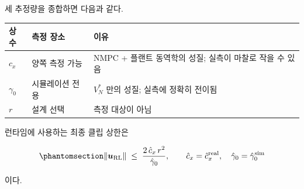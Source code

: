 \documentclass[
  11pt,
]{article}
\newcounter{none} %
\theoremstyle{plain}
\theoremstyle{plain}
\theoremstyle{definition}
\theoremstyle{remark}
\begin{document}
세 추정량을 종합하면 다음과 같다.

{\def\LTcaptype{none} %
\begin{longtable}[]{@{}
  >{\raggedright\arraybackslash}p{}
  >{\raggedright\arraybackslash}p{}
  >{\raggedright\arraybackslash}p{}@{}}
\toprule\noalign{}
\begin{minipage}[b]{\linewidth}\raggedright
상수
\end{minipage} & \begin{minipage}[b]{\linewidth}\raggedright
측정 장소
\end{minipage} & \begin{minipage}[b]{\linewidth}\raggedright
이유
\end{minipage} \\
\midrule\noalign{}
\endhead
\bottomrule\noalign{}
\endlastfoot
\(c_x\) & 양쪽 측정 가능 & NMPC + 플랜트 동역학의 성질; 실측이 마찰로
작을 수 있음 \\
\(\gamma_0\) & 시뮬레이션 전용 & \(V_N^*\) 만의 성질; 실측에 정확히
전이됨 \\
\(r\) & 설계 선택 & 측정 대상이 아님 \\
\end{longtable}
}

런타임에 사용하는 최종 클립 상한은

\begin{equation}\protect\phantomsection\label{eq-final-clip}{
\|\bm{u}_{\mathrm{RL}}\|
\;\le\;
\frac{2\,\hat{c}_x\,r^2}{\hat{\gamma}_0},
\qquad
\hat{c}_x = \hat{c}_x^{\mathrm{real}},
\quad
\hat{\gamma}_0 = \hat{\gamma}_0^{\mathrm{sim}}
}\end{equation}

이다.
\end{document}
